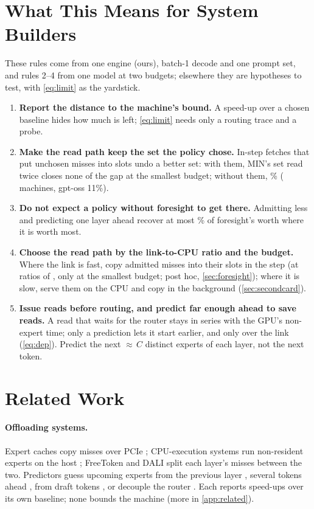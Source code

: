 \section{What This Means for System Builders}\label{sec:builders}
These rules come from one engine (ours), batch-1 decode and one prompt set, and rules 2--4 from one model at two budgets;
elsewhere they are hypotheses to test, with \cref{eq:limit} as the yardstick.
\begin{enumerate}\setlength\itemsep{1pt}
\item \textbf{Report the distance to the machine's bound.} A speed-up over a chosen baseline hides how much is left;
\cref{eq:limit} needs only a routing trace and a probe.
\item \textbf{Make the read path keep the set the policy chose.} In-step fetches that put unchosen misses into slots
undo a better set: with them, MIN's set read twice closes none of the gap at the smallest budget; without them,
\dpShSetaloneZeroLowRng\% (\dpNWord{} machines, gpt-oss 11\%).
\item \textbf{Do not expect a policy without foresight to get there.} Admitting less and predicting one layer ahead
recover at most \olCapLowMax\% of foresight's worth where it is worth most.
\item \textbf{Choose the read path by the link-to-CPU ratio and the budget.} Where the link is fast, copy admitted
misses into their slots in the step (at ratios of \dpRatioLoRatioRng, only at the smallest budget; post hoc, \cref{sec:foresight}); where it is slow,
serve them on the CPU and copy in the background (\cref{sec:secondcard}).
\item \textbf{Issue reads before routing, and predict far enough ahead to save reads.} A read that waits for the router
stays in series with the GPU's non-expert time; only a prediction lets it start earlier, and only over the link
(\cref{eq:dep}). Predict the next $\approx$\dcMed$\,C$ distinct experts of each layer, not the next token.
\end{enumerate}

\section{Related Work}\label{sec:related}
\paragraph{Offloading systems.} Expert caches copy misses over PCIe
\citep{eliseev2023offloading,xue2024moeinfinity,song2024promoe,tang2024hobbit}; CPU-execution systems run non-resident
experts on the host \citep{kamahori2024fiddler,ktransformers,zhong2025hybrimoe,daop2025}; FreeToken \citep{freetoken} and DALI \citep{dali2026} split each layer's misses between the two. Predictors guess
upcoming experts from the previous layer \citep{hwang2024pregated,zhu2025preattention}, several tokens ahead
\citep{wang2026seqmoe,mira2026}, from draft tokens \citep{spmoe,moespac2026,cascade2025}, or decouple the router
\citep{readme2024}. Each reports speed-ups over its own baseline; none bounds the machine
(more in \cref{app:related}).

